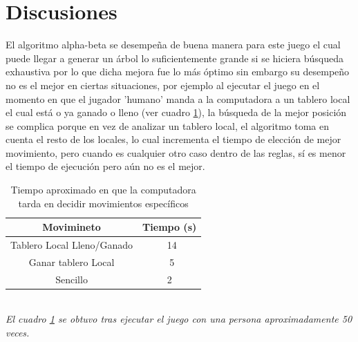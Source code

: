 \documentclass[runningheads]{llncs}
\begin{document}
\section{Discusiones}
El algoritmo alpha-beta se desempeña de buena manera para este juego el cual puede llegar a generar un árbol lo suficientemente grande si se hiciera búsqueda exhaustiva por lo que dicha mejora fue lo más óptimo sin embargo su desempeño no es el mejor en ciertas situaciones, por ejemplo al ejecutar el juego en el momento en que el jugador 'humano' manda a la computadora a un tablero local el cual está o ya ganado o lleno (ver cuadro \ref{tab:1}), la búsqueda de la mejor posición se complica porque en vez de analizar un tablero local, el algoritmo toma en cuenta el resto de los locales, lo cual incrementa el tiempo de elección de mejor movimiento, pero cuando es cualquier otro caso dentro de las reglas, sí es menor el tiempo de ejecución pero aún no es el mejor.
\begin{table}
\begin{center}
\begin{tabular}{| c | c |}
Movimineto & Tiempo (s) \\ \hline
Tablero Local Lleno/Ganado & ~14  \\
Ganar tablero Local & ~5\\
Sencillo &  2 \\ \hline
\end{tabular}
\caption{Tiempo aproximado en que la computadora tarda en decidir movimientos específicos}
\label{tab:1}
\end{center}
\end{table}
\\
\textit{El cuadro \ref{tab:1} se obtuvo tras ejecutar el juego con una persona aproximadamente 50 veces.}
\end{document}

